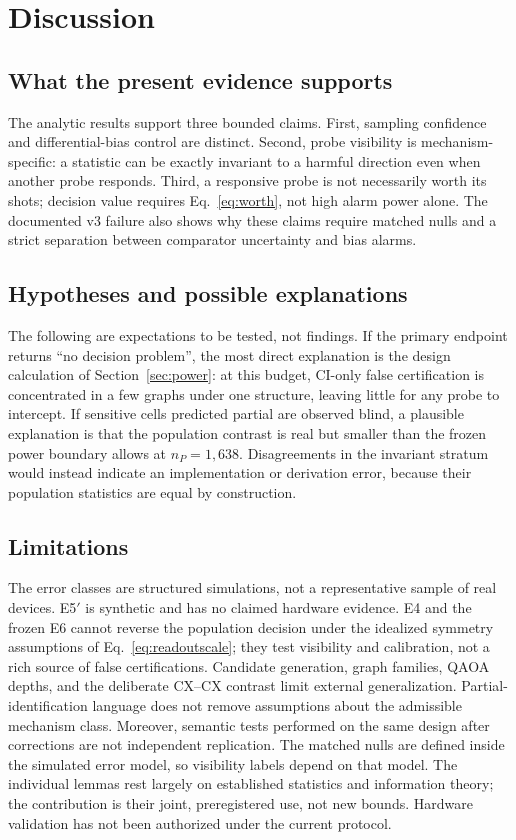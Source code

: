 \documentclass[10pt,twocolumn]{article}
\begin{document}
\section{Discussion}

\subsection{What the present evidence supports}

The analytic results support three bounded claims. First, sampling confidence
and differential-bias control are distinct. Second, probe visibility is
mechanism-specific: a statistic can be exactly invariant to a harmful direction
even when another probe responds. Third, a responsive probe is not necessarily
worth its shots; decision value requires Eq.~\eqref{eq:worth}, not high alarm
power alone. The documented v3 failure also shows why these claims require
matched nulls and a strict separation between comparator uncertainty and bias
alarms.

\subsection{Hypotheses and possible explanations}

The following are expectations to be tested, not findings. If the primary
endpoint returns ``no decision problem'', the most direct explanation is the
design calculation of Section~\ref{sec:power}: at this budget, CI-only false certification
is concentrated in a few graphs under one structure, leaving little for any
probe to intercept. If sensitive cells predicted partial are observed blind,
a plausible explanation is that the population contrast is real but smaller
than the frozen power boundary allows at $n_P=1{,}638$. Disagreements in the
invariant stratum would instead indicate an implementation or derivation
error, because their population statistics are equal by construction.

\subsection{Limitations}

The error classes are structured simulations, not a representative sample of
real devices. E5$'$ is synthetic and has no claimed hardware evidence. E4 and
the frozen E6 cannot reverse the population decision under the idealized
symmetry assumptions of Eq.~\eqref{eq:readoutscale}; they test visibility and
calibration, not a rich source of false certifications. Candidate generation,
graph families, QAOA depths, and the deliberate CX--CX contrast limit external
generalization. Partial-identification language does not remove assumptions
about the admissible mechanism class. Moreover, semantic tests performed on the
same design after corrections are not independent replication. The matched
nulls are defined inside the simulated error model, so visibility labels
depend on that model. The individual lemmas rest largely on established
statistics and information theory; the contribution is their joint,
preregistered use, not new bounds. Hardware validation has not been
authorized under the current protocol.
\end{document}
